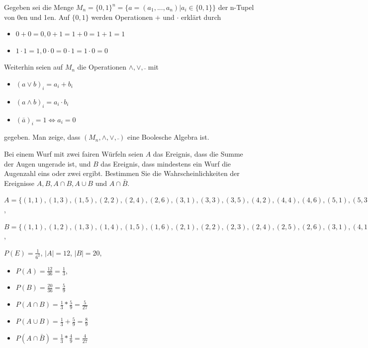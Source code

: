 \documentclass[10pt, a4paper]{exam}
\begin{document}
\begin{questions}
    \question Gegeben sei die Menge $M_n=\{0,1\}^n =\{a=(a_1,...,a_n)|a_i\in\{0,1\}\}$ der n-Tupel von 0en und 1en. Auf $\{0,1\}$ werden Operationen $+$ und $\cdot$ erklärt durch
    \begin{itemize}
        \item $0 + 0 = 0, 0 + 1 = 1 + 0 = 1 + 1 = 1$
        \item $1 \cdot 1 = 1, 0 \cdot 0 = 0 \cdot 1 = 1 \cdot 0 = 0$
    \end{itemize}
    Weiterhin seien auf $M_n$ die Operationen $\wedge, \vee, \bar{}$ mit
    \begin{itemize}
        \item $(a\vee b)_i = a_i + b_i$
        \item $(a\wedge b)_i = a_i \cdot b_i$
        \item $(\bar{a})_i = 1 \Leftrightarrow a_i = 0$
    \end{itemize}
    gegeben. Man zeige, dass $(M_n,\wedge,\vee,\bar{})$ eine Boolesche Algebra ist.
    \begin{solution}
    \end{solution}

    \question Bei einem Wurf mit zwei fairen Würfeln seien $A$ das Ereignis, dass die Summe der Augen ungerade ist, und $B$ das Ereignis, dass mindestens ein Wurf die Augenzahl eins oder zwei ergibt. Bestimmen Sie die Wahrscheinlichkeiten der Ereignisse $A, B, A\cap B, A\cup B$ und $A\cap\bar{B}$.
    \begin{solution}

        $A=\{(1,1),(1,3),(1,5),(2,2),(2,4),(2,6),(3,1),(3,3),(3,5),(4,2),(4,4),(4,6),(5,1),(5,3),(5,6),(6,2),(6,4),(6,6)\}$,

        $B=\{(1,1),(1,2),(1,3),(1,4),(1,5),(1,6),(2,1),(2,2),(2,3),(2,4),(2,5),(2,6),(3,1),(4,1),(5,1),(6,1),(3,2),(4,2),(5,2),(6,2)\}$,

        $P(E)=\frac{1}{6^2}$,
        $|A|=12$,
        $|B|=20$,

        \begin{itemize}
            \item $P(A)=\frac{12}{36}=\frac{1}{3}$,
            \item $P(B)=\frac{20}{36}=\frac{5}{9}$
            \item $P(A\cap B)= \frac{1}{3}*\frac{5}{9}=\frac{5}{27}$
            \item $P(A\cup B)= \frac{1}{3}+\frac{5}{9}=\frac{8}{9}$
            \item $P(A\cap\bar{B})= \frac{1}{3}*\frac{4}{9}=\frac{4}{27}$
        \end{itemize}
    \end{solution}


\end{questions}
\end{document}
